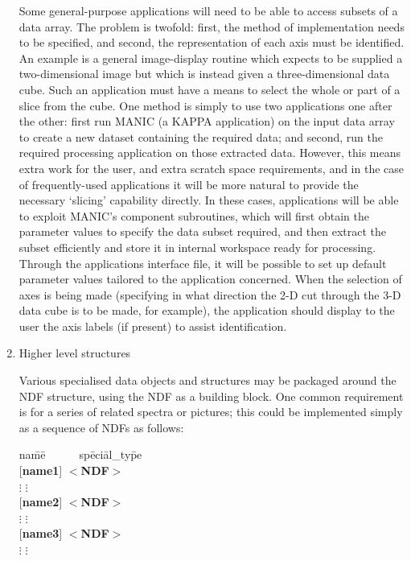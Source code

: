 \begin{enumerate}
Some general-purpose applications will need to be able to access subsets
of a data array.  The problem is twofold: first, the method of
implementation needs to be specified, and second, the representation of
each axis must be identified.  An example is a general image-display
routine which expects to be supplied a two-dimensional image but which is
instead given a three-dimensional
data cube.  Such an application must have a
means to select the whole or part of a
slice from the cube.  One method is simply to use
two applications one after the other: first run MANIC 
(a {\small KAPPA} application) on the input data array to create a
new dataset containing the required
data; and second, run the required processing
application on those extracted data.  However,
this means extra work for the user, and extra scratch
space requirements, and in the case of frequently-used
applications it
will be more natural to provide the necessary
`slicing' capability directly.
In these cases, applications will be able to
exploit MANIC's component subroutines,
which will first obtain the parameter values
to specify the data subset required, and
then extract the subset efficiently and store it in
internal workspace ready for processing.
Through the applications interface file, it will be
possible to set up default parameter values
tailored to the application concerned.
When the selection of axes is being made (specifying in what
direction the 2-D cut through the 3-D data cube is to be made,
for example),
the application should display to the user the
axis labels (if present) to assist identification.

\item Higher level structures

Various specialised data objects and structures may be packaged around
the NDF structure, using the NDF as a building block.  One common
requirement is for a series of related spectra or pictures;  this
could be implemented simply as a sequence of NDFs as follows:
\begin{tabbing}

na\=me\=~~~~~~sp\=eci\=al\_ty\=pe\+ \\
  {[}{\bf name1}{]} \> \> $<${\bf NDF}$>$\+ \\
    $\vdots$ \> \>$\vdots$\- \\
  {[}{\bf name2}{]} \> \> $<${\bf NDF}$>$\+ \\
    $\vdots$ \> \>$\vdots$\- \\
  {[}{\bf name3}{]} \> \> $<${\bf NDF}$>$\+ \\
    $\vdots$ \> \>$\vdots$\- \\


\end{tabbing}
\end{enumerate}
